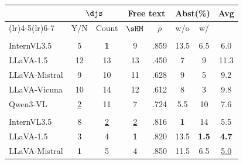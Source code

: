 \begin{table}[t]
\centering
\small
\setlength{\tabcolsep}{3.5pt}
\renewcommand{\arraystretch}{0.96}

\begin{tabular}{>{\raggedright\arraybackslash}p{2.6cm}ccccccc}
\toprule
\multirow{2}{*}{\textbf{Model}} & \multicolumn{2}{c}{$\djs$} & \multicolumn{2}{c}{Free text} & \multicolumn{2}{c}{Abst(\%)} & \multirow{2}{*}{\textbf{Avg}} \\
\cmidrule(lr){2-3}\cmidrule(lr){4-5}\cmidrule(lr){6-7}
 & Y/N & Count & $\sHM$ & $\rho$ & w/o & w/ & \\
\midrule
\multicolumn{8}{c}{\textit{VLMs}}\\
\midrule
InternVL3.5 & \cellcolor{orange!30}5 & \cellcolor{gray!20}\textbf{1} & \cellcolor{green!20}9 & \cellcolor{gray!20}.859 & 13.5 & \cellcolor{gray!10}6.5 & \cellcolor{gray!15}6.0 \\
LLaVA-1.5 & \cellcolor{gray!10}12 & 13 & \cellcolor{gray!15}13 & .450 & \cellcolor{gray!10}7 & \cellcolor{gray!10}9 & 11.3 \\
LLaVA-Mistral & \cellcolor{gray!15}9 & \cellcolor{gray!5}10 & \cellcolor{green!20}11 & \cellcolor{gray!5}.628 & \cellcolor{gray!10}9 & \cellcolor{gray!15}5 & \cellcolor{gray!5}9.2 \\
LLaVA-Vicuna & \cellcolor{gray!10}10 & 14 & \cellcolor{gray!20}12 & \cellcolor{gray!5}.612 & \cellcolor{gray!10}8 & \cellcolor{gray!15}3 & \cellcolor{gray!5}9.8 \\
Qwen3-VL & \cellcolor{green!20}\underline{2} & \cellcolor{gray!5}11 & \cellcolor{green!20}7 & \cellcolor{gray!5}.724 & \cellcolor{gray!15}5.5 & \cellcolor{gray!5}10 & \cellcolor{gray!10}7.6 \\
\midrule
\multicolumn{8}{c}{\textit{Backbone Decoders}}\\
\midrule
InternVL3.5 & \cellcolor{orange!30}8 & \cellcolor{gray!15}\underline{2} & \cellcolor{green!20}\underline{2} & \cellcolor{gray!10}.816 & \cellcolor{gray!20}\textbf{1} & 14 & \cellcolor{gray!15}5.5 \\
LLaVA-1.5 & \cellcolor{orange!30}3 & \cellcolor{gray!10}4 & \cellcolor{green!20}\textbf{1} & \cellcolor{gray!15}.820 & 13.5 & \cellcolor{gray!20}\textbf{1.5} & \cellcolor{gray!20}\textbf{4.7} \\
LLaVA-Mistral & \cellcolor{green!20}\textbf{1} & \cellcolor{gray!10}5 & \cellcolor{green!20}4 & \cellcolor{gray!20}.850 & \cellcolor{gray!5}11.5 & \cellcolor{gray!10}6.5 & \cellcolor{gray!20}\underline{5.0} \\

\end{tabular}
\end{table}
